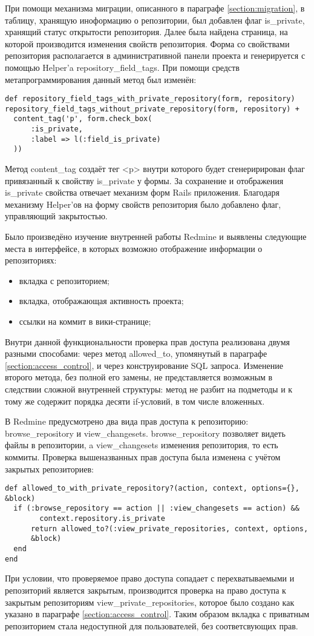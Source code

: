 При помощи механизма миграции, описанного в параграфе \ref{section:migration},
в таблицу, хранящую иноформацию о репозитории, был добавлен флаг is\_private,
хранящий статус открытости репозитория. Далее была найдена страница, на которой
производится изменения свойств репозитория. Форма со свойствами репозитория
располагается в административной панели проекта и генерируется с помощью
Helper'a repository\_field\_tags. При помощи средств метапрограммирования
данный метод был изменён:
\small{\begin{lstlisting}
def repository_field_tags_with_private_repository(form, repository)
repository_field_tags_without_private_repository(form, repository) +
  content_tag('p', form.check_box(
      :is_private,
      :label => l(:field_is_private)
  ))
\end{lstlisting}}
Метод content_tag создаёт тег <p> внутри которого будет
сгенеририрован флаг привязанный к свойству is\_private у формы. За сохранение и
отображения is\_private свойства отвечает механизм форм Rails приложения.
Благодаря механизму Helper'ов на форму свойств репозитория было добавлено
флаг, управляющий закрытостью.

Было произведёно изучение внутренней работы Redmine и выявлены следующие места
в интерфейсе, в которых возможно отображение информации о репозиториях:
\begin{itemize}
  \item вкладка с репозиторием;
  \item вкладка, отображающая активность проекта;
  \item ссылки на коммит в вики-странице;
\end{itemize}
Внутри данной функциональности проверка прав доступа реализована двумя разными
способами: через метод allowed_to, упомянутый в параграфе
\ref{section:access_control}, и через конструирование SQL запроса. Изменение
второго метода, без полной его замены, не представляется возможным в следствии
сложной внутренней структуры: метод не разбит на подметоды и к тому же
содержит порядка десяти if-условий, в том числе вложенных. 

В Redmine предусмотрено два вида прав доступа к репозиторию:
browse\_repository и view\_changesets. browse\_repository позволяет видеть
файлы в репозитории, a view\_changesets изменения репозитория, то есть коммиты.
Проверка вышеназванных прав доступа была изменена с учётом закрытых
репозиториев:
\small{\begin{lstlisting}
def allowed_to_with_private_repository?(action, context, options={}, &block)
  if (:browse_repository == action || :view_changesets == action) &&
        context.repository.is_private 
      return allowed_to?(:view_private_repositories, context, options,
      &block)       
  end
end
\end{lstlisting}}
При условии, что проверяемое право доступа сопадает с перехватываемыми и
репозиторий является закрытым, производится проверка на право доступа к
закрытым репозиториям view_private_repositories, которое было создано как
указано в параграфе \ref{section:access_control}. Таким образом вкладка с
приватным репозиторием стала недоступной для пользователей, без соответсвующих
прав.

